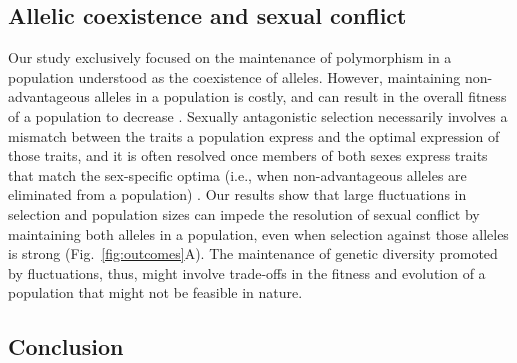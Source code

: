 

\subsection*{Allelic coexistence and sexual conflict}

Our study exclusively focused on the maintenance of polymorphism in a population understood as the coexistence of alleles. However, maintaining non-advantageous alleles in a population is costly, and can result in the overall fitness of a population to decrease  \citep{connallon2018environmental}. Sexually antagonistic selection necessarily involves a mismatch between the traits a population express and the optimal expression of those traits, and it is often resolved once members of both sexes express traits that match the sex-specific optima (i.e., when non-advantageous alleles are eliminated from a population) \citep{lande1980sexual}. Our results show that large fluctuations in selection and population sizes can impede the resolution of sexual conflict by maintaining both alleles in a population, even when selection against those alleles is strong (Fig.~\ref{fig:outcomes}A). The maintenance of genetic diversity promoted by fluctuations, thus, might involve trade-offs in the fitness and evolution of a population that might not be feasible in nature.


\subsection*{Conclusion}

